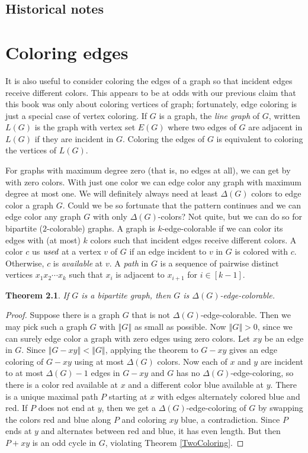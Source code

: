 \documentclass[openany]{tufte-book} %
\theoremstyle{plain}
\newtheorem{theorem}{Theorem}
\newcommand{\size}[1]{\left\Vert#1\right\Vert}
\newcommand{\irange}[1]{\left[#1\right]}
\begin{document}
\section{Historical notes}


\chapter{Coloring edges}
It is also useful to consider coloring the edges of a graph so that incident edges receive different colors.  This
appears to be at odds with our previous claim that this book was only about coloring vertices of graph; fortunately, edge coloring
is just a special case of vertex coloring.  If $G$ is a graph, the \emph{line graph} of $G$, written
$L(G)$ is the graph with vertex set $E(G)$ where two edges of $G$ are adjacent in $L(G)$ if they are incident in $G$.  Coloring
the edges of $G$ is equivalent to coloring the vertices of $L(G)$.

For graphs with maximum degree zero (that is, no edges at all), we can get by with zero colors.  
With just one color we can edge color any graph with maximum degree at most one.  We will definitely always need at least $\Delta(G)$ colors
to edge color a graph $G$.  Could we be so fortunate that the pattern continues
and we can edge color any graph $G$ with only $\Delta(G)$-colors? Not quite, but we can do so for bipartite ($2$-colorable) graphs.
A graph is $k$-edge-colorable if we can color its edges with (at most) $k$ colors such that incident edges receive different colors.
A color $c$ us $\emph{used}$ at a vertex $v$ of $G$ if an edge incident to $v$ in $G$ is colored with $c$. Otherwise, $c$ is \emph{available} at $v$.
A \emph{path} in $G$ is a sequence of pairwise distinct vertices $x_1x_2\cdots x_k$ such that $x_i$ is adjacent to $x_{i+1}$ for $i \in \irange{k-1}$.

\begin{theorem}\label{DeltaEdgeColoring}
If $G$ is a bipartite graph, then $G$ is $\Delta(G)$-edge-colorable.
\end{theorem}
\begin{proof}
Suppose there is a graph $G$ that is not $\Delta(G)$-edge-colorable.  Then we may pick such a graph $G$ with $\size{G}$ as small as possible.
Now $\size{G} > 0$, since we can surely edge color a graph with zero edges using zero colors.  Let $xy$ be an edge in $G$.  Since $\size{G-xy} < \size{G}$,
applying the theorem to $G-xy$ gives an edge coloring of $G-xy$ using at most $\Delta(G)$ colors.  Now each of $x$ and $y$ are incident to at most $\Delta(G) - 1$ edges
in $G-xy$ and $G$ has no $\Delta(G)$-edge-coloring, so there is a color red available at $x$ and a different color blue available at $y$.  There is a unique maximal 
path $P$ starting at $x$ with edges alternately colored blue and red. If $P$ does not end at $y$, then we get a $\Delta(G)$-edge-coloring of $G$ by swapping the colors red and blue 
along $P$ and coloring $xy$ blue, a contradiction.  Since $P$ ends at $y$ and alternates between red and blue, it has even length.  But then $P + xy$ is an odd cycle in $G$, violating
Theorem \ref{TwoColoring}.
\end{proof}
\end{document}
